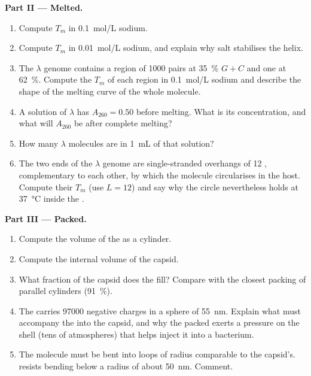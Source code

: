 \begin{problem}
\medskip
\noindent\textbf{Part II --- Melted.}
\begin{enumerate}[resume]
  \item Compute $T_m$ in \qty{0.1}{mol/L} sodium.
  \item Compute $T_m$ in \qty{0.01}{mol/L} sodium, and explain why
        salt stabilises the helix.
  \item The $\lambda$ genome contains a region of \qty{1000}{} pairs at
        \qty{35}{\%} $G + C$ and one at \qty{62}{\%}. Compute the $T_m$
        of each region in \qty{0.1}{mol/L} sodium and describe the
        shape of the melting curve of the whole molecule.
  \item A solution of $\lambda$  has $A_{260} = 0.50$ before
        melting. What is its concentration, and what will $A_{260}$
        be after complete melting?
  \item How many $\lambda$ molecules are in \qty{1}{mL} of that
        solution?
  \item The two ends of the $\lambda$ genome are single-stranded
        overhangs of 12 , complementary to each other, by
        which the molecule circularises in the host. Compute their
        $T_m$ (use $L = 12$) and say why the circle nevertheless holds
        at \qty{37}{\celsius} inside the .
\end{enumerate}

\medskip
\noindent\textbf{Part III --- Packed.}
\begin{enumerate}[resume]
  \item Compute the volume of the  as a cylinder.
  \item Compute the internal volume of the capsid.
  \item What fraction of the capsid does the  fill? Compare with
        the closest packing of parallel cylinders (\qty{91}{\%}).
  \item The  carries \num{97000} negative charges in a sphere of
        \qty{55}{nm}. Explain what must accompany the  into the
        capsid, and why the packed  exerts a pressure on the shell
        (tens of atmospheres) that helps inject it into a bacterium.
  \item The molecule must be bent into loops of radius comparable to
        the capsid's.  resists bending below a radius of about
        \qty{50}{nm}. Comment.
\end{enumerate}


\end{problem}

